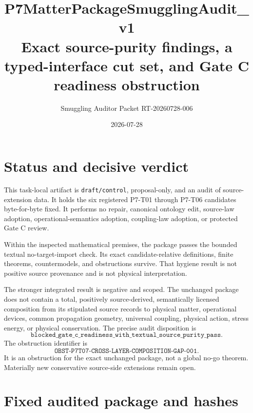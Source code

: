 \documentclass[11pt]{article}
\title{P7MatterPackageSmugglingAudit\_v1\\
\large Exact source-purity findings, a typed-interface cut set, and Gate C
readiness obstruction}
\author{Smuggling Auditor Packet RT-20260728-006}
\date{2026-07-28}
\begin{document}
\maketitle

\section{Status and decisive verdict}

This task-local artifact is \texttt{draft/control}, proposal-only, and an
audit of source-extension data. It holds the six registered P7-T01 through
P7-T06 candidates byte-for-byte fixed. It performs no repair, canonical
ontology edit, source-law adoption, operational-semantics adoption,
coupling-law adoption, or protected Gate C review.

Within the inspected mathematical premises, the package passes the bounded
textual no-target-import check. Its exact candidate-relative definitions,
finite theorems, countermodels, and obstructions survive. That hygiene result
is not positive source provenance and is not physical interpretation.

The stronger integrated result is negative and scoped. The unchanged package
does not contain a total, positively source-derived, semantically licensed
composition from its stipulated source records to physical matter,
operational devices, common propagation geometry, universal coupling,
physical action, stress energy, or physical conservation. The precise audit
disposition is
\[
 \texttt{blocked\_gate\_c\_readiness\_with\_textual\_source\_purity\_pass}.
\]
The obstruction identifier is
\[
 \texttt{OBST-P7T07-CROSS-LAYER-COMPOSITION-GAP-001}.
\]
It is an obstruction for the exact unchanged package, not a global no-go
theorem. Materially new conservative source-side extensions remain open.

\section{Fixed audited package and hashes}
\end{document}

